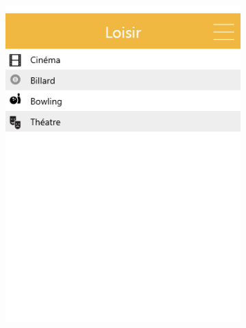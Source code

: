\documentclass{eplmastersthesis}
\begin{document}
\begin{figure}[H]
    \begin{subfigure}[b]{0.3\textwidth}
        \includegraphics[width=\textwidth]{Images/InVision/loisir.png}
    \end{subfigure}
\end{figure}
\end{document}
